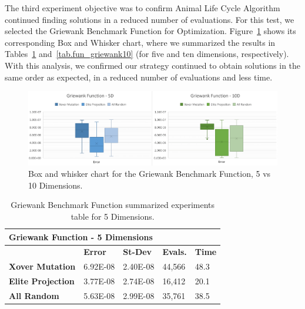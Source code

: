 \documentclass[graybox]{svmult}
\begin{document}
            The third experiment objective was to confirm Animal Life Cycle
            Algorithm continued finding solutions in a reduced number of
            evaluations. For this test, we selected the Griewank Benchmark
            Function for Optimization. Figure~\ref{fig.fun_griewank} shows its
            corresponding Box and Whisker chart, where we summarized the
            results in Tables~\ref{tab.fun_griewank5} and~\ref{tab.fun_griewank10} 
            (for five and ten dimensions, respectively). With this analysis, 
            we confirmed our strategy continued to obtain solutions in the same 
            order as expected, in a reduced number of evaluations and less time.

            \begin{figure}
                \includegraphics[width=0.99\linewidth, frame]{img/fig_fun_griewank.pdf}
                \caption{Box and whisker chart for the Griewank Benchmark Function, 5 vs 10 Dimensions.} \label{fig.fun_griewank}
                \end{figure}

            \begin{table}[]
                \scriptsize
                \centering
                \caption{Griewank Benchmark Function summarized experiments table for 5 Dimensions.}\label{tab.fun_griewank5}
                \begin{tabular}{@{}lllll@{}}
                \toprule
                \multicolumn{5}{l}{\textbf{Griewank Function - 5 Dimensions}} \\ \midrule
                & \textbf{Error} & \textbf{St-Dev} & \textbf{Evals.} & \textbf{Time} \\
                \textbf{Xover Mutation} & 6.92E-08 & 2.40E-08 & 44,566 & 48.3 \\
                \textbf{Elite Projection} & 3.77E-08 & 2.74E-08 & 16,412 & 20.1 \\
                \textbf{All Random} & 5.63E-08 & 2.99E-08 & 35,761 & 38.5 \\ \bottomrule
                \end{tabular}
                \end{table}
\end{document}
